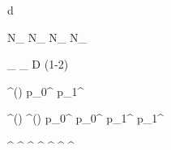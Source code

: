 
\newmathsymbol{\tagdecision}     {d}
\newmathsymbol{\tg}              {\tagdecision}
\newmathsymbol{\mistagestimate}  {\eta}
\newmathsymbol{\deltamistagestimate}{\Delta\mistagestimate}
\newmathsymbol{\mistag}          {\omega}
\newmathsymbol{\deltamistag}     {\Delta\mistag}

\newmathsymbol{\Ntagged}         {N_}
\newmathsymbol{\NRtagged}        {N_}
\newmathsymbol{\NWtagged}        {N_}
\newmathsymbol{\NUtagged}        {N_}

\newmathsymbol{\tageff}          {\eps_}
\newmathsymbol{\efftageff}       {\eps_}
\newmathsymbol{\tagdilution}     {D}
\newmathsymbol{\tagdilutionlg}   {(1-2\mistag)}

\newcommand{\p}[2]                {p_{#1}^{#2}}
\newcommand{\deltap}[2]           {\Delta p_{#1}^{#2}}
\newcommand{\omegaofeta}[1]       {\mistag^{#1}(\mistagestimate)}
\newmathsymbol{\omofeta}          {\omegaofeta{}}
\newmathsymbol{\pzero}            {\p{0}{}}
\newmathsymbol{\deltapzero}       {}
\newmathsymbol{\pone}             {\p{1}{}}
\newmathsymbol{\deltapone}        {}
\newmathsymbol{\avgmistagestimate}{\langle\mistagestimate\rangle}

\newmathsymbol{\omofetaBd}        {\omegaofeta{\Bd}}
\newmathsymbol{\omofetaBdbar}     {\omegaofeta{\Bdbar}}
\newmathsymbol{\pzeroBd}          {\p{0}{\Bd}}
\newmathsymbol{\pzeroBdbar}       {\p{0}{\Bdbar}}
\newmathsymbol{\poneBd}           {\p{1}{\Bd}}
\newmathsymbol{\poneBdbar}        {\p{1}{\Bdbar}}

\newmathsymbol{\tgos}        {\tagdecision^}
\newmathsymbol{\mistagestos} {\mistagestimate^}
\newmathsymbol{\mistagos}    {\mistag^}
\newmathsymbol{\pzeroos}     {\pzero^}
\newmathsymbol{\pzeroosll}   {\pzero^}
\newmathsymbol{\pzeroosdd}   {\pzero^}
\newmathsymbol{\poneos}      {\pone^}
\newmathsymbol{\avgmistagestos}{\langle\mistagestos\rangle}
\newmathsymbol{\avgmistagestosll}{\langle\mistagestosll\rangle}
\newmathsymbol{\avgmistagestosdd}{\langle\mistagestosdd\rangle}


